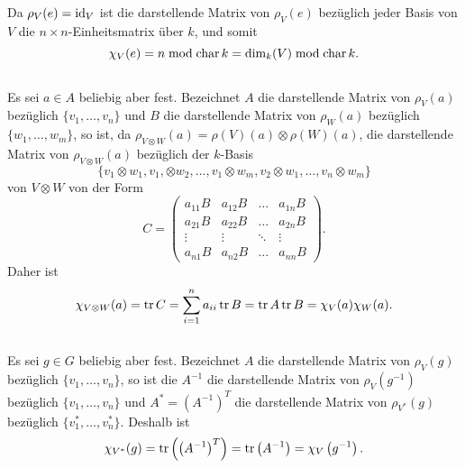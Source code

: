 \documentclass[a4paper,10pt]{article}
\begin{document}
\subsection{}
Da $\rho_V(e) = \operatorname{id}_V$ ist die darstellende Matrix von $\rho_V(e)$ bezüglich jeder Basis von $V$ die $n \times n$-Einheitsmatrix über $k$, und somit
\[
 \chi_V(e) = n \bmod \operatorname{char} k = \dim_k(V) \bmod \operatorname{char} k.
\]



\subsection{}
Es sei $a \in A$ beliebig aber fest. Bezeichnet $A$ die darstellende Matrix von $\rho_V(a)$ bezüglich $\{v_1, \ldots, v_n\}$ und $B$ die darstellende Matrix von $\rho_W(a)$ bezüglich $\{w_1, \ldots, w_m\}$, so ist, da $\rho_{V \otimes W}(a) = \rho(V)(a) \otimes \rho(W)(a)$, die darstellende Matrix von $\rho_{V \otimes W}(a)$ bezüglich der $k$-Basis
\[
 \{v_1 \otimes w_1, v_1, \otimes w_2, \ldots, v_1 \otimes  w_m, v_2 \otimes w_1, \ldots, v_n \otimes w_m\}
\]
von $V \otimes W$ von der Form
\[
 C =
 \begin{pmatrix}
  a_{11} B & a_{12} B & \ldots & a_{1n} B \\
  a_{21} B & a_{22} B & \ldots & a_{2n} B \\
    \vdots &   \vdots & \ddots &   \vdots \\
  a_{n1} B & a_{n2} B & \ldots & a_{nn} B
 \end{pmatrix}.
\]
Daher ist
\[
 \chi_{V \otimes W}(a) = \operatorname{tr} C = \sum_{i=1}^n a_{ii} \operatorname{tr}{B} = \operatorname{tr} A \operatorname{tr} B = \chi_V(a) \chi_W(a).
\]



\subsection{}
Es sei $g \in G$ beliebig aber fest. Bezeichnet $A$ die darstellende Matrix von $\rho_V(g)$ bezüglich $\{v_1, \ldots, v_n\}$, so ist die $A^{-1}$ die darstellende Matrix von $\rho_V\left(g^{-1}\right)$ bezüglich $\{v_1, \ldots, v_n\}$ und $A^* = (A^{-1})^T$ die darstellende Matrix von $\rho_{V^*}(g)$ bezüglich $\{v_1^*, \ldots, v_n^*\}$. Deshalb ist
\[
 \chi_{V^*}(g) = \operatorname{tr}\left(\left(A^{-1}\right)^T\right) = \operatorname{tr}\left( A^{-1} \right) = \chi_V\left(g^{-1}\right).
\]
\end{document}
